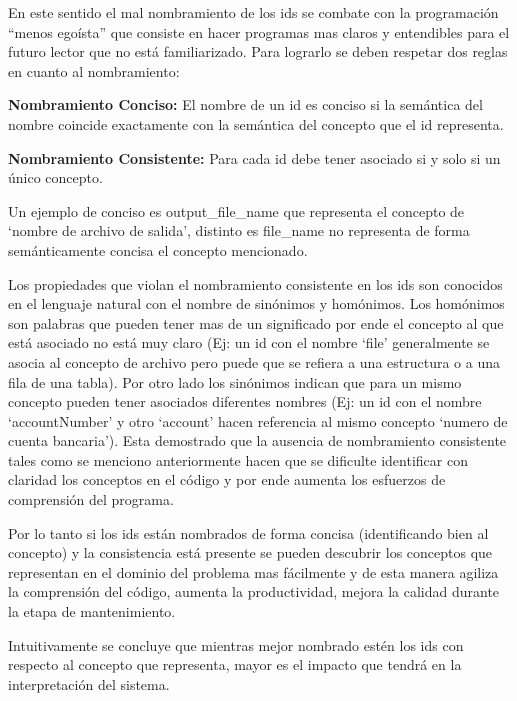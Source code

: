 \documentclass[a4paper,12pt]{report}
\begin{document}
En este sentido el mal nombramiento de los ids se combate con la programación “menos egoísta” que consiste en hacer programas mas claros y entendibles para el futuro lector que no está familiarizado. Para lograrlo se deben respetar dos reglas en cuanto al nombramiento\cite{DFPM05,DLHD06}:

\begin{framed}
\noindent \textbf{Nombramiento Conciso:} El nombre de un id es conciso si la semántica del nombre coincide exactamente con la semántica del concepto que el id representa.

\noindent \textbf{Nombramiento  Consistente:} Para cada id debe tener asociado si y solo si un único concepto.
\end{framed}

Un ejemplo de conciso es \textsf{output\_file\_name} que representa el concepto de `nombre de archivo de salida', distinto es \textsf{file\_name} no representa de forma semánticamente concisa el concepto mencionado.

Los propiedades que violan el nombramiento consistente en los ids son conocidos en el lenguaje natural con el nombre de sinónimos y homónimos. Los homónimos son palabras que pueden tener mas de un significado por ende el concepto al que está asociado no está muy claro (Ej: un id con el nombre `file' generalmente se asocia al concepto de archivo pero puede que se refiera a una estructura o a una fila de una tabla). Por otro lado los sinónimos indican que para un mismo concepto pueden tener asociados diferentes nombres (Ej: un id con el nombre `accountNumber' y otro `account' hacen referencia al mismo concepto `numero de cuenta bancaria'). Esta demostrado que la ausencia de nombramiento consistente tales como se menciono anteriormente hacen que se dificulte identificar con claridad los conceptos en el código y por ende aumenta los esfuerzos de comprensión del programa. 


Por lo tanto si los ids están nombrados de forma concisa (identificando bien al concepto) y la consistencia está presente se pueden descubrir los conceptos que representan en el dominio del problema mas fácilmente y de esta manera agiliza la comprensión del código, aumenta la productividad, mejora la calidad durante la etapa de mantenimiento\cite{DFPM05,DLHD06}.%

Intuitivamente se concluye 	que mientras mejor nombrado estén los ids con respecto al concepto que representa, mayor es el impacto que tendrá en la interpretación del sistema\cite{DFPM05,DLHD06}.
\end{document}
